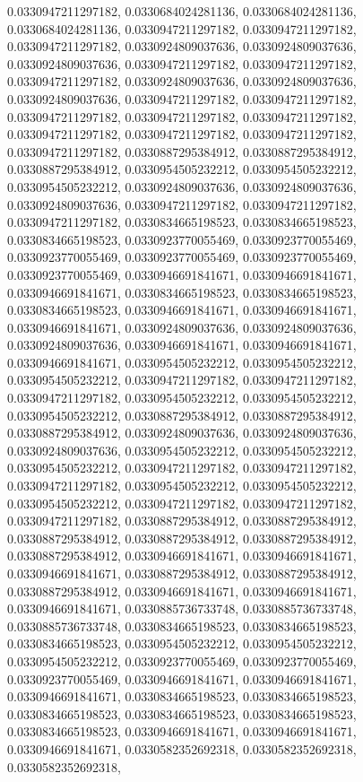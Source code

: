 \documentclass[
  ,man]{apa6}
\begin{document}
0.0330947211297182, 0.0330684024281136, 0.0330684024281136, 0.0330684024281136, 0.0330947211297182, 0.0330947211297182, 0.0330947211297182, 0.0330924809037636, 0.0330924809037636, 0.0330924809037636, 0.0330947211297182, 0.0330947211297182, 0.0330947211297182, 0.0330924809037636, 0.0330924809037636, 0.0330924809037636, 0.0330947211297182, 0.0330947211297182, 0.0330947211297182, 0.0330947211297182, 0.0330947211297182, 0.0330947211297182, 0.0330947211297182, 0.0330947211297182, 0.0330947211297182, 0.0330887295384912,
0.0330887295384912, 0.0330887295384912, 0.0330954505232212, 0.0330954505232212, 0.0330954505232212, 0.0330924809037636, 0.0330924809037636, 0.0330924809037636, 0.0330947211297182, 0.0330947211297182, 0.0330947211297182, 0.0330834665198523, 0.0330834665198523, 0.0330834665198523, 0.0330923770055469, 0.0330923770055469, 0.0330923770055469, 0.0330923770055469, 0.0330923770055469, 0.0330923770055469, 0.0330946691841671, 0.0330946691841671, 0.0330946691841671, 0.0330834665198523, 0.0330834665198523, 0.0330834665198523,
0.0330946691841671, 0.0330946691841671, 0.0330946691841671, 0.0330924809037636, 0.0330924809037636, 0.0330924809037636, 0.0330946691841671, 0.0330946691841671, 0.0330946691841671, 0.0330954505232212, 0.0330954505232212, 0.0330954505232212, 0.0330947211297182, 0.0330947211297182, 0.0330947211297182, 0.0330954505232212, 0.0330954505232212, 0.0330954505232212, 0.0330887295384912, 0.0330887295384912, 0.0330887295384912, 0.0330924809037636, 0.0330924809037636, 0.0330924809037636, 0.0330954505232212, 0.0330954505232212,
0.0330954505232212, 0.0330947211297182, 0.0330947211297182, 0.0330947211297182, 0.0330954505232212, 0.0330954505232212, 0.0330954505232212, 0.0330947211297182, 0.0330947211297182, 0.0330947211297182, 0.0330887295384912, 0.0330887295384912, 0.0330887295384912, 0.0330887295384912, 0.0330887295384912, 0.0330887295384912, 0.0330946691841671, 0.0330946691841671, 0.0330946691841671, 0.0330887295384912, 0.0330887295384912, 0.0330887295384912, 0.0330946691841671, 0.0330946691841671, 0.0330946691841671, 0.0330885736733748,
0.0330885736733748, 0.0330885736733748, 0.0330834665198523, 0.0330834665198523, 0.0330834665198523, 0.0330954505232212, 0.0330954505232212, 0.0330954505232212, 0.0330923770055469, 0.0330923770055469, 0.0330923770055469, 0.0330946691841671, 0.0330946691841671, 0.0330946691841671, 0.0330834665198523, 0.0330834665198523, 0.0330834665198523, 0.0330834665198523, 0.0330834665198523, 0.0330834665198523, 0.0330946691841671, 0.0330946691841671, 0.0330946691841671, 0.0330582352692318, 0.0330582352692318, 0.0330582352692318,
\end{document}
